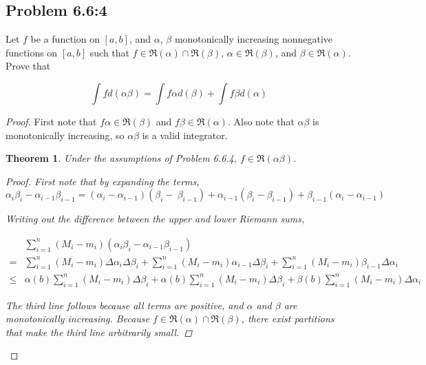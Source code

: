 \documentclass{amsart}
\newcommand{\RiemannIntable}{
  \mathfrak{R}
}
\newtheorem{theorem}{Theorem}[subsection]
\begin{document}
\subsection*{Problem 6.6:4}

Let $f$ be a function on $[a, b]$, and $\alpha$, $\beta$ monotonically increasing nonnegative functions on $[a, b]$ such that $f \in \RiemannIntable(\alpha) \cap \RiemannIntable(\beta)$, $\alpha \in \RiemannIntable(\beta)$, and $\beta \in \RiemannIntable(\alpha)$. Prove that

\[
\int f d(\alpha \beta) = \int f \alpha d(\beta) + \int f \beta d(\alpha)
\]

\begin{proof}

First note that $f\alpha \in \RiemannIntable(\beta)$ and $f\beta \in \RiemannIntable(\alpha)$. Also note that $\alpha\beta$ is monotonically increasing, so $\alpha\beta$ is a valid integrator.

\begin{theorem}
Under the assumptions of Problem 6.6.4, $f \in \RiemannIntable(\alpha\beta)$.
\begin{proof}

First note that by expanding the terms,
\[
\alpha_i\beta_i - \alpha_{i-1}\beta_{i-1} = (\alpha_i - \alpha_{i-1})(\beta_i - \ \beta_{i-1})
+ \alpha_{i-1}(\beta_i - \beta_{i-1}) + \beta_{i-1}(\alpha_i - \alpha_{i-1})
\]

Writing out the difference between the upper and lower Riemann sums,

\begin{align*}
& \sum_{i=1}^n (M_i - m_i)(\alpha_i\beta_i - \alpha_{i-1}\beta_{i-1}) \\
= & \sum_{i=1}^n (M_i - m_i)\Delta\alpha_i \Delta\beta_i
+ \sum_{i=1}^n (M_i - m_i)\alpha_{i-1} \Delta\beta_i
+ \sum_{i=1}^n (M_i - m_i)\beta_{i-1} \Delta\alpha_i \\
\leq 
& \alpha(b)\sum_{i=1}^n (M_i - m_i) \Delta\beta_i
+ \alpha(b)\sum_{i=1}^n (M_i - m_i) \Delta\beta_i
+ \beta(b)\sum_{i=1}^n (M_i - m_i) \Delta\alpha_i
\end{align*}

The third line follows because all terms are positive, and $\alpha$ and $\beta$ are monotonically increasing. Because $f \in \RiemannIntable(\alpha)\cap \RiemannIntable(\beta)$, there exist partitions that make the third line arbitrarily small.

\end{proof}
\end{theorem}


\end{proof}
\end{document}
